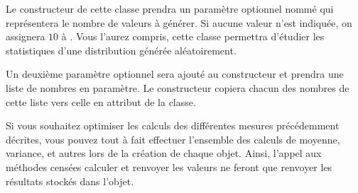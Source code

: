 \documentclass[11pt,a4paper]{article}
\begin{document}
\bigskip

Le constructeur de cette classe prendra un paramètre optionnel nommé  qui représentera le nombre de valeurs à générer.
Si aucune valeur n'est indiquée, on assignera $ 10 $ à .
Vous l'aurez compris, cette classe permettra d'étudier les statistiques d'une distribution générée aléatoirement.

\bigskip


\bigskip

Un deuxième paramètre optionnel sera ajouté au constructeur et prendra une liste de nombres en paramètre.
Le constructeur copiera chacun des nombres de cette liste vers celle en attribut de la classe.

\bigskip

Si vous souhaitez optimiser les calculs des différentes mesures précédemment décrites, vous pouvez tout à fait effectuer l'ensemble des calculs de moyenne, variance, et autres lors de la création de chaque objet.
Ainsi, l'appel aux méthodes censées calculer et renvoyer les valeurs ne feront que renvoyer les résultats stockés dans l'objet.

\bigskip

\end{document}
